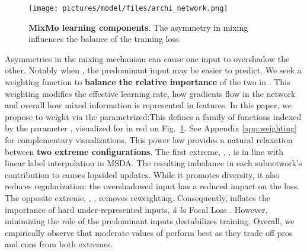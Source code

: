 \documentclass[10pt,twocolumn,letterpaper]{article}
\begin{document}
\begin{figure}\texttt{[image: pictures/model/files/archi\_network.png]}\caption{\textbf{MixMo learning components}. The asymmetry in mixing influences the balance of the training loss.}\label{fig:archi_network}\end{figure}%
Asymmetries in the mixing mechanism can cause one
input to overshadow the other. Notably when , the predominant input may be easier to predict.
We seek a weighting function  to \textbf{balance the relative importance} of the two  in
. This weighting modifies the effective learning rate, how gradients flow in the network and overall how mixed information is represented in features.
In this paper, we propose to weight via the parametrized:This defines a family of functions indexed by the parameter , visualized for  in red on Fig.~\ref{fig:archi_network}. See Appendix \ref{app:weighting} for complementary visualizations. This power law provides a natural relaxation between \textbf{two extreme configurations}. The first extreme, , , is in line with linear label interpolation in MSDA. The resulting imbalance in each subnetwork's contribution to  causes lopsided updates. While it promotes diversity, it also reduces regularization: the overshadowed input has a reduced impact on the loss. The opposite extreme, , , removes reweighting. Consequently,  inflates the importance of hard under-represented inputs, \textit{à la} Focal Loss \cite{lin2017focal}. However, minimizing the role of the predominant inputs destabilizes training. Overall, we empirically observe that moderate values of  perform best as they trade off pros and cons from both extremes.
\end{document}
